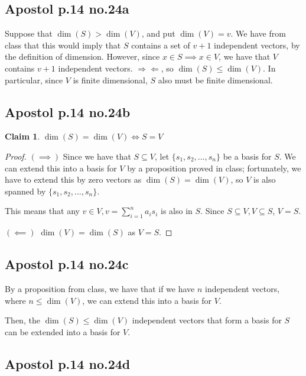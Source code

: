 \documentclass[12pt,letterpaper]{article}
\theoremstyle{definition}
\newtheorem*{claim}{Claim}
\newcommand{\contra}{\Rightarrow\!\Leftarrow}
\begin{document}
\subsection*{Apostol p.14 no.24a}

Suppose that $\dim(S) > \dim(V)$, and put $\dim(V) = v$. We have
from class that this would imply that $S$ contains a set of $v + 1$ independent
vectors, by the definition of dimension. However, since $x \in S \implies x \in
V$, we have that $V$ contains $v + 1$ independent vectors. $\contra$, so
$\dim(S) \leq \dim(V)$. In particular, since $V$ is finite dimensional, $S$ also
must be finite dimensional.

\subsection*{Apostol p.14 no.24b}

\begin{claim}
  $\dim(S) = \dim(V) \iff S = V$
\end{claim}

\begin{proof}
  $(\implies)$ Since we have that $S \subseteq V$, let $\{s_1, s_2, ..., s_n\}$
  be a basis for $S$. We can extend this into a basis for $V$ by a proposition
  proved in class; fortunately, we have to extend this by zero vectors as
  $\dim(S) = \dim(V)$, so $V$ is also spanned by $\{s_1, s_2, ..., s_n\}$.

  This means that any $v \in V, v = \sum_{i=1}^na_is_i$ is also in $S$. Since $S
  \subseteq V, V \subseteq S$, $V = S$.

  $(\impliedby)$ $\dim(V) = \dim(S)$ as $V = S$.
\end{proof}

\subsection*{Apostol p.14 no.24c}

By a proposition from class, we have that if we have $n$ independent vectors,
where $n \leq \dim(V)$, we can extend this into a basis for $V$. 

Then, the $\dim(S) \leq \dim(V)$ independent vectors that form a basis for $S$
can be extended into a basis for $V$.

\subsection*{Apostol p.14 no.24d}
\end{document}

